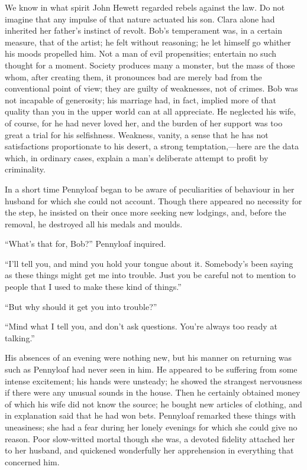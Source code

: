 We know in what spirit John Hewett regarded rebels against the law. Do
not imagine that any impulse of that nature actuated his son. Clara
alone had inherited her father's instinct of revolt. Bob's temperament
was, in a certain measure, that of the artist; he felt without
reasoning; he let himself go whither his moods propelled him. Not a man
of evil propensities; entertain no such thought for a moment. Society
produces many a monster, but the mass of those whom, after creating
them, it pronounces bad are merely bad from the conventional point of
view; they are guilty of weaknesses, not of crimes. Bob was not
incapable of generosity; his marriage had, in fact, implied more of that
quality than you in the upper world can at all appreciate. He neglected
his wife, of {}course, for he had never loved her, and the burden of her
support was too great a trial for his selfishness. Weakness, vanity, a
sense that he has not satisfactions proportionate to his desert, a
strong temptation,---here are the data which, in ordinary cases, explain
a man's deliberate attempt to profit by criminality.

In a short time Pennyloaf began to be aware of peculiarities of
behaviour in her husband for which she could not account. Though there
appeared no necessity for the step, he insisted on their once more
seeking new lodgings, and, before the removal, he destroyed all his
medals and moulds.

``What's that for, Bob?'' Pennyloaf inquired.

``I'll tell you, and mind you hold your tongue about it. Somebody's been
saying as these things might get me into trouble. Just you be careful
not to mention to people that I used to make these kind of things.''

``But why should it get you into trouble?''

``Mind what I tell you, and don't ask questions. You're always too ready
at talking.''

{}His absences of an evening were nothing new, but his manner on
returning was such as Pennyloaf had never seen in him. He appeared to be
suffering from some intense excitement; his hands were unsteady; he
showed the strangest nervousness if there were any unusual sounds in the
house. Then he certainly obtained money of which his wife did not know
the source; he bought new articles of clothing, and in explanation said
that he had won bets. Pennyloaf remarked these things with uneasiness;
she had a fear during her lonely evenings for which she could give no
reason. Poor slow-witted mortal though she was, a devoted fidelity
attached her to her husband, and quickened wonderfully her apprehension
in everything that concerned him.

